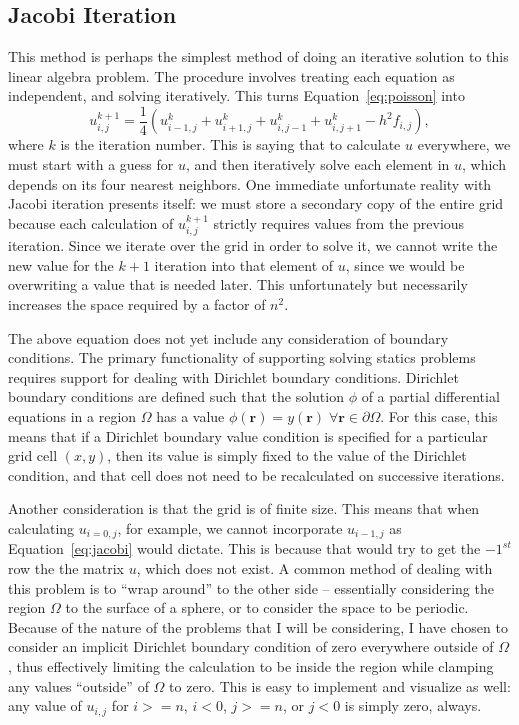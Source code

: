 \subsection{Jacobi Iteration}
This method is perhaps the simplest method of doing an iterative solution to this linear algebra problem. The procedure
involves treating each equation as independent, and solving iteratively. This turns Equation~\ref{eq:poisson} into\cite{poisson-relax}
\begin{equation} \label{eq:jacobi}
u_{i,j}^{k+1} = \frac{1}{4}(u_{i-1,j}^{k} + u_{i+1,j}^{k} + u_{i,j-1}^{k} + u_{i,j+1}^{k} - h^2f_{i,j}),
\end{equation}
where $k$ is the iteration number. This is saying that to calculate $u$ everywhere, we must start with a guess for $u$,
and then iteratively solve each element in $u$, which depends on its four nearest neighbors. One immediate unfortunate
reality with Jacobi iteration presents itself: we must store a secondary copy of the entire grid because each calculation
of $u_{i,j}^{k+1}$ strictly requires values from the previous iteration. Since we iterate over the grid in order to solve
it, we cannot write the new value for the $k+1$ iteration into that element of $u$, since we would be overwriting a value
that is needed later. This unfortunately but necessarily increases the space required by a factor of $n^2$.

The above equation does not yet include any consideration of boundary conditions. The primary functionality of supporting solving statics problems requires support for dealing with
Dirichlet boundary conditions. Dirichlet boundary conditions are defined such that the solution $\phi$ of a partial
differential equations in a region $\Omega$ has a value $\phi(\mathbf{r}) = y(\mathbf{r}) \; \forall \mathbf{r} \in \partial \Omega$.
For this case, this means that if a Dirichlet boundary value condition is specified for a particular grid cell $(x,y)$,
then its value is simply fixed to the value of the Dirichlet condition, and that cell does not need to be recalculated on
successive iterations.

Another consideration is that the grid is of finite size. This means that when calculating $u_{i=0,j}$, for example, we cannot
incorporate $u_{i-1,j}$ as Equation~\ref{eq:jacobi} would dictate. This is because that would try to get the $-1^{st}$ row the
the matrix $u$, which does not exist. A common method of dealing with this problem is to ``wrap around'' to the other side --
essentially considering the region $\Omega$ to the surface of a sphere, or to consider the space to be periodic. Because of
the nature of the problems that I will be considering, I have chosen to consider an implicit Dirichlet boundary condition
of zero everywhere outside of $\Omega$, thus effectively limiting the calculation to be inside the region while clamping any
values ``outside'' of $\Omega$ to zero. This is easy to implement and visualize as well: any value of $u_{i,j}$ for $i >= n$,
$i < 0$, $j >= n$, or $j < 0$ is simply zero, always.

